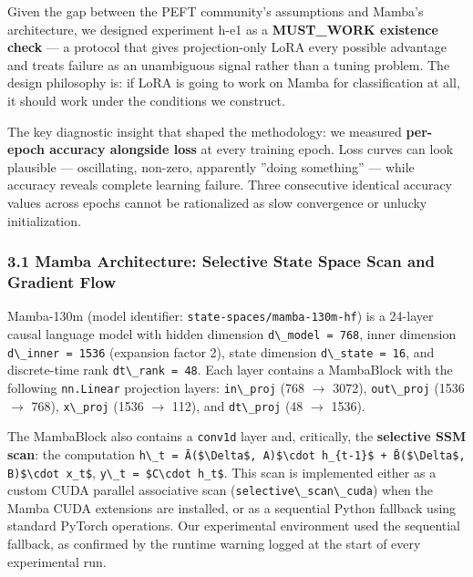 
Given the gap between the PEFT community's assumptions and Mamba's architecture, we designed experiment h-e1 as a \textbf{MUST\_WORK existence check} --- a protocol that gives projection-only LoRA every possible advantage and treats failure as an unambiguous signal rather than a tuning problem. The design philosophy is: if LoRA is going to work on Mamba for classification at all, it should work under the conditions we construct.

The key diagnostic insight that shaped the methodology: we measured \textbf{per-epoch accuracy alongside loss} at every training epoch. Loss curves can look plausible --- oscillating, non-zero, apparently ''doing something'' --- while accuracy reveals complete learning failure. Three consecutive identical accuracy values across epochs cannot be rationalized as slow convergence or unlucky initialization.

\subsubsection{3.1 Mamba Architecture: Selective State Space Scan and Gradient Flow}

Mamba-130m (model identifier: \texttt{state-spaces/mamba-130m-hf}) is a 24-layer causal language model with hidden dimension \texttt{d\textbackslash \_model = 768}, inner dimension \texttt{d\textbackslash \_inner = 1536} (expansion factor 2), state dimension \texttt{d\textbackslash \_state = 16}, and discrete-time rank \texttt{dt\textbackslash \_rank = 48}. Each layer contains a MambaBlock with the following \texttt{nn.Linear} projection layers: \texttt{in\textbackslash \_proj} (768 $\rightarrow$ 3072), \texttt{out\textbackslash \_proj} (1536 $\rightarrow$ 768), \texttt{x\textbackslash \_proj} (1536 $\rightarrow$ 112), and \texttt{dt\textbackslash \_proj} (48 $\rightarrow$ 1536).

The MambaBlock also contains a \texttt{conv1d} layer and, critically, the \textbf{selective SSM scan}: the computation \texttt{h\textbackslash \_t = Ā(\$\textbackslash Delta\$, A)\$\textbackslash cdot h\_\{t-1\}\$ + B̄(\$\textbackslash Delta\$, B)\$\textbackslash cdot x\_t\$}, \texttt{y\textbackslash \_t = \$C\textbackslash cdot h\_t\$}. This scan is implemented either as a custom CUDA parallel associative scan (\texttt{selective\textbackslash \_scan\textbackslash \_cuda}) when the Mamba CUDA extensions are installed, or as a sequential Python fallback using standard PyTorch operations. Our experimental environment used the sequential fallback, as confirmed by the runtime warning logged at the start of every experimental run.


